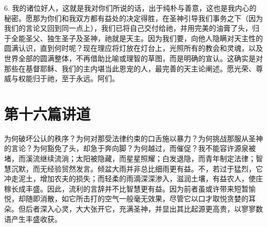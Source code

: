 6. 我的诸位好人，这就是我对你们所说的话，出于纯朴与善意，这也是我内心的秘密。愿那为你们和我双方都有益处的决定得胜，在圣神引导我们事务之下（因为我们的言论又回到同一点上），我们已将自己交付给祂，并用完美的油膏了头，归于全能圣父、独生圣子及圣神，祂就是天主。因为我们要，向他人隐瞒对天主性的圆满认识，直到何时呢？现在理应将灯放在灯台上，光照所有的教会和灵魂，以及世界全部的圆满整体，不再借助比喻或理智的草图，而是明确的宣认。这确实是对那些在基督耶稣、我们的主内堪当此恩宠的人，最完善的天主论阐述。愿光荣、尊威与权能归于祂，至于永远。阿们。\par



\section{第十六篇讲道}

\par

\par

为何破坏公认的秩序？为何对那受法律约束的口舌施以暴力？为何挑战那服从圣神的言论？为何豁免了头，却急于奔向脚？为何越过，而催促？我不能容许源泉被堵，而溪流继续流淌；太阳被隐藏，而星星照耀；白发退隐，而青年制定法律；智慧沉默，而无经验贸然发言。倾盆大雨并非总比细雨更有益。不，若过于猛烈，它冲走泥土，增加农夫的损失；而轻柔的雨滴深深渗入，滋润土壤，有益农人，使庄稼长成丰盛。因此，流利的言辞并不比智慧更有益。因为前者虽或许带来短暂愉悦，却随即消散，如它所击打的空气一般毫无效果，尽管它以口才取悦贪婪的耳朵。但后者深入心灵，大大张开它，充满圣神，并显出其比起源更高贵，以寥寥数语产生丰盛收获。\par

